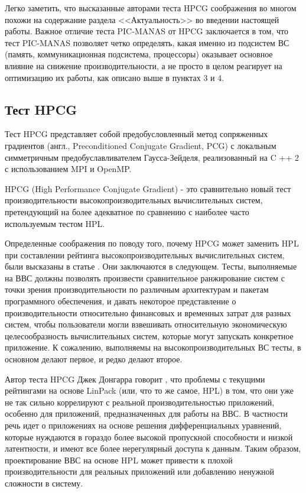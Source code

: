 Легко заметить, что высказанные авторами теста HPCG соображения во многом похожи на содержание раздела <<Актуальность>> во введении настоящей работы. Важное отличие теста PIC-MANAS от HPCG заключается в том, что тест PIC-MANAS позволяет четко определять, какая именно из подсистем ВС (память, коммуникационная подсистема, процессоры) оказывает основное влияние на снижение производительности, а не просто в целом реагирует на оптимизацию их работы, как описано выше в пунктах 3 и 4.

\subsection{Тест HPCG}
Тест HPCG представляет собой предобусловленный метод сопряженных градиентов
(англ., Preconditioned Conjugate Gradient, PCG) с локальным симметричным предобуславливателем Гаусса-Зейделя, реализованный на C ++ 2 с использованием MPI и OpenMP. 

HPCG (High Performance Conjugate Gradient) \cite{Dongarra2016HighperformanceCB} - это сравнительно новый тест производительности высокопроизводительных вычислительных систем, претендующий на более адекватное по сравнению с наиболее часто используемым тестом HPL.

Определенные соображения по поводу того, почему HPCG может заменить HPL при составлении рейтинга высокопроизводительных вычислительных систем, были высказаны в статье \cite{HPCGreplaceHPL}. Они заключаются в следующем. Тесты, выполняемые на ВВС должны позволять произвести сравнительное ранжирование систем с точки зрения производительности по различным архитектурам и пакетам программного обеспечения, и давать некоторое представление о производительности относительно финансовых и временных затрат для разных систем, чтобы пользователи могли взвешивать относительную экономическую целесообразность вычислительных систем, которые могут запускать конкретное приложение. К сожалению, выполняемы на высокопроизводительных ВС тесты, в основном делают первое, и редко делают второе. 

Автор теста HPCG Джек Донгарра говорит \cite{Dongarra2016HighperformanceCB}, что проблемы с текущими рейтингами на основе LinPack (или, что то же самое, HPL) в том, что они уже не так сильно коррелируют с реальной производительностью приложений, особенно для приложений, предназначенных для работы на ВВС. В частности речь идет о приложениях на основе решения дифференциальных уравнений, которые нуждаются в гораздо более высокой пропускной способности и низкой латентности, и имеют все более нерегулярный доступа к данным. Таким образом, проектирование ВВС на основе HPL может привести к плохой производительности для реальных приложений или добавлению ненужной сложности в систему.


